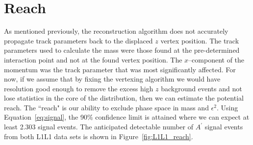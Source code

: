 \section{Reach}
As mentioned previously, the reconstruction algorithm does not accurately propagate track parameters back to the displaced $z$ vertex position. The track parameters used to calculate the mass were those found at the pre-determined interaction point and not at the found vertex position. The $x$--component of the momentum was the track parameter that was most significantly affected. For now, if we assume that by fixing the vertexing algorithm we would have resolution good enough to remove the excess high $z$ background events and not lose statistics in the core of the distribution, then we can estimate the potential reach. The ``reach" is our ability to exclude phase space in mass and $\epsilon^2$. Using Equation~\eqref{eq:signal}, the 90$\%$ confidence limit is attained where we can expect at least 2.303 signal events. The anticipated detectable number of $A^{\prime}$ signal events from both L1L1 data sets is shown in Figure~\ref{fig:L1L1_reach}.
